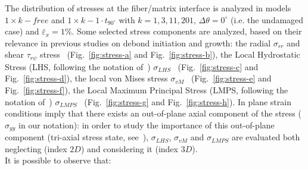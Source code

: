 \documentclass[12pt,a4paper]{article}
\begin{document}
The distribution of stresses at the fiber/matrix interface is analyzed in models $1\times k-free$ and $1\times k-1\cdot t_{90^{\circ}}$ with $k=1,3,11,201$, $\Delta\theta=0^{\circ}$ (i.e. the undamaged case) and $\bar{\varepsilon}_{x}=1\%$. Some selected stress components are analyzed, based on their relevance in previous studies on debond initiation and growth: the radial $\sigma_{rr}$ and shear $\tau_{r\psi}$ stress~\cite{Mantic2009} (Fig.~\ref{fig:stress-a} and Fig.~\ref{fig:stress-b}), the Local Hydrostatic Stress (LHS, following the notation of~\cite{Carraro2016}) $\sigma_{LHS}$~\cite{Asp1996a,Asp1996b} (Fig.~\ref{fig:stress-c} and Fig.~\ref{fig:stress-d}), the local von Mises stress $\sigma_{vM}$~\cite{Canal2012}  (Fig.~\ref{fig:stress-e} and Fig.~\ref{fig:stress-f}), the Local Maximum Principal Stress (LMPS, following the notation of~\cite{Carraro2016}) $\sigma_{LMPS}$~\cite{Carraro2014}  (Fig.~\ref{fig:stress-g} and Fig.~\ref{fig:stress-h}). In plane strain conditions imply that there exists an out-of-plane axial component of the stress ($\sigma_{yy}$ in our notation): in order to study the importance of this out-of-plane component (tri-axial stress state, see~\cite{Asp1995}), $\sigma_{LHS}$, $\sigma_{vM}$ and $\sigma_{LMPS}$ are evaluated both neglecting (index $2D$) and considering it (index $3D$).\\
It is possible to observe that:
\vspace{-5pt}
\end{document}
